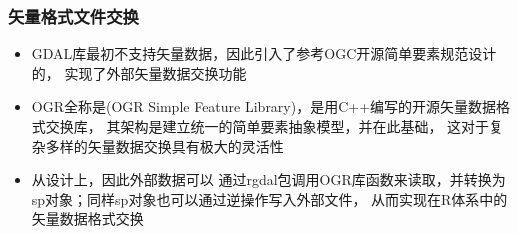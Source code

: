 \subsubsection{矢量格式文件交换}
\begin{frame}[t,fragile]{\subsecname}{\subsubsecname}
\begin{itemize} 
\item<1-> GDAL库最初不支持矢量数据，因此引入了参考OGC开源简单要素规范设计的，
实现了外部矢量数据交换功能
\item<2-> OGR全称是(OGR Simple Feature Library)，是用C++编写的开源矢量数据格式交换库，
其架构是建立统一的简单要素抽象模型，并在此基础，
这对于复杂多样的矢量数据交换具有极大的灵活性
\item<3-> 从设计上，因此外部数据可以
通过rgdal包调用OGR库函数来读取，并转换为sp对象；同样sp对象也可以通过逆操作写入外部文件，
从而实现在R体系中的矢量数据格式交换
\end{itemize}
\end{frame}

